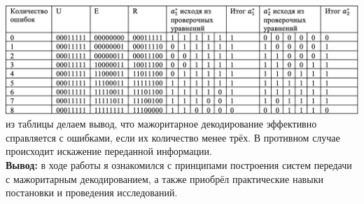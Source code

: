 \documentclass[11pt]{article}
\begin{document}
\includegraphics[width=1\linewidth]{table.png}
 из таблицы делаем вывод, что мажоритарное декодирование эффективно справляется с ошибками, если их количество менее трёх. В противном случае происходит искажение переданной информации.\\
\textbf{Вывод:} в ходе работы я ознакомился с принципами построения систем передачи с мажоритарным декодированием, а также приобрёл практические навыки постановки и проведения исследований.
\end{document}
